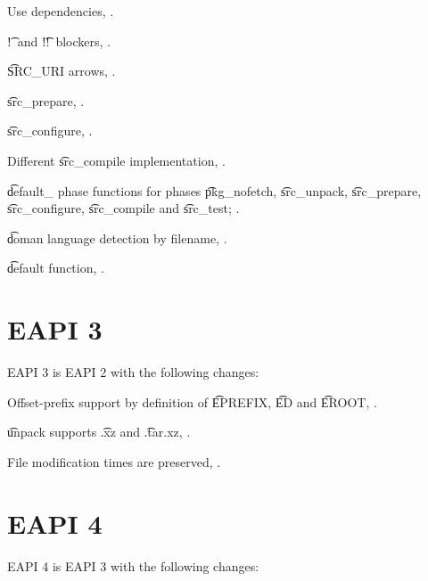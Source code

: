 \begin{compactitem}
\item Use dependencies, .
\item \t{!}\ and \t{!!}\ blockers, .
\item \t{SRC\_URI} arrows, .
\item \t{src\_prepare}, .
\item \t{src\_configure}, .
\item Different \t{src\_compile} implementation, .
\item \t{default\_} phase functions for phases \t{pkg\_nofetch}, \t{src\_unpack}, \t{src\_prepare},
    \t{src\_configure}, \t{src\_compile} and \t{src\_test}; .
\item \t{doman} language detection by filename, .
\item \t{default} function, .
\end{compactitem}

\section*{EAPI 3}

EAPI 3 is EAPI 2 with the following changes:
\begin{compactitem}
\item Offset-prefix support by definition of \t{EPREFIX}, \t{ED} and \t{EROOT},
    .
\item \t{unpack} supports \t{.xz} and \t{.tar.xz}, .
\item File modification times are preserved, .
\end{compactitem}

\section*{EAPI 4}

EAPI 4 is EAPI 3 with the following changes:

